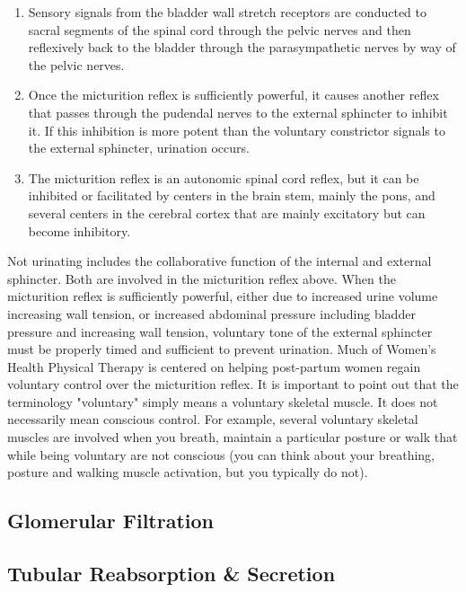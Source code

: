 \begin{enumerate}
    \item Sensory signals from the bladder wall stretch receptors are conducted to sacral segments of the spinal cord through the pelvic nerves and then reflexively back to the bladder through the parasympathetic nerves by way of the pelvic nerves.
    \item  Once the micturition reflex is sufficiently powerful, it causes another reflex that passes through the pudendal nerves to the external sphincter to inhibit it. If this inhibition is more potent than the voluntary constrictor signals to the external sphincter, urination occurs.
    \item  The micturition reflex is an autonomic spinal cord reflex, but it can be inhibited or facilitated by centers in the brain stem, mainly the pons, and several centers in the cerebral cortex that are mainly excitatory but can become inhibitory.
\end{enumerate}

Not urinating includes the collaborative function of the internal and external sphincter. Both are involved in the micturition reflex above. When the micturition reflex is sufficiently powerful, either due to increased urine volume increasing wall tension, or increased abdominal pressure including bladder pressure and increasing wall tension, voluntary tone of the external sphincter must be properly timed and sufficient to prevent urination. Much of Women's Health Physical Therapy is centered on helping post-partum women regain voluntary control over the micturition reflex. It is important to point out that the terminology "voluntary" simply means a voluntary skeletal muscle. It does not necessarily mean conscious control. For example, several voluntary skeletal muscles are involved when you breath, maintain a particular posture or walk that while being voluntary are not conscious (you can think about your breathing, posture and walking muscle activation, but you typically do not).


\subsection{Glomerular Filtration}

\subsection{Tubular Reabsorption \& Secretion}

